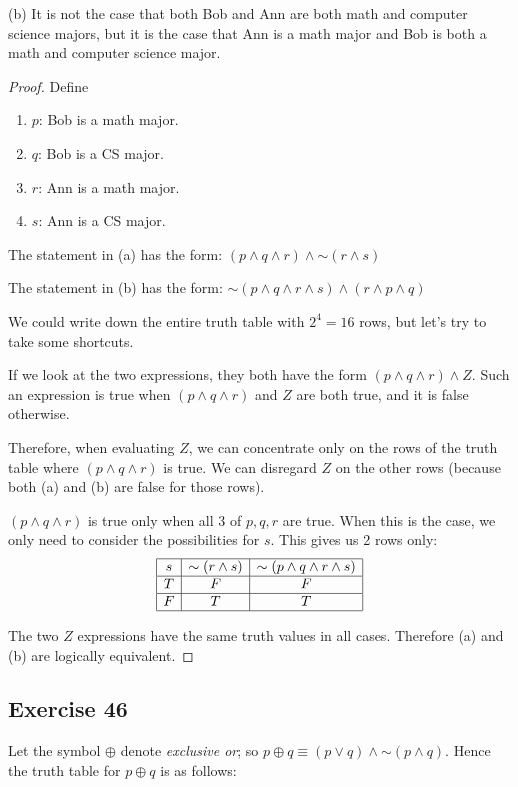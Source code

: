 \documentclass[14pt]{extarticle}
\begin{document}
(b)
It is not the case that both Bob and Ann are both math and computer science
majors, but it is the case that Ann is a math major and Bob is both a math and
computer science major.

\begin{proof}
Define
\begin{enumerate}
\item $p$: Bob is a math major.
\item $q$: Bob is a CS major.
\item $r$: Ann is a math major.
\item $s$: Ann is a CS major.
\end{enumerate}

The statement in (a) has the form:
$(p \wedge q \wedge r) \wedge {\sim (r \wedge s)}$

The statement in (b) has the form:
${\sim (p \wedge q \wedge r \wedge s)} \wedge (r \wedge p \wedge q)$

We could write down the entire truth table with $2^4 = 16$ rows, but let's try
to take some shortcuts.

If we look at the two expressions, they both have the form
$(p \wedge q \wedge r) \wedge Z$. Such an expression is true when $(p \wedge q
\wedge r)$ and $Z$ are both true, and it is false otherwise.

Therefore, when evaluating $Z$, we can concentrate only on the rows of the truth
table where $(p \wedge q \wedge r)$ is true. We can disregard $Z$ on the other
rows (because both (a) and (b) are false for those rows).

$(p \wedge q \wedge r)$ is true only when all 3 of $p, q, r$ are true. When this
is the case, we only need to consider the possibilities for $s$. This gives us 2
rows only:
$$
\begin{array}{|c|c|c|}
\hline
s & {\sim (r \wedge s)} & {\sim (p \wedge q \wedge r \wedge s)} \\
\hline
T & F & F \\
\hline
F & T & T \\
\hline
\end{array}
$$

The two $Z$ expressions have the same truth values in all cases. Therefore (a)
and (b) are logically equivalent.
\end{proof}

\subsection{Exercise 46}
Let the symbol $\oplus$ denote {\it exclusive or}; so $p \oplus q \equiv (p \vee
q) \wedge {\sim(p \wedge q)}$. Hence the truth table for $p \oplus q$ is as
follows:
\end{document}
